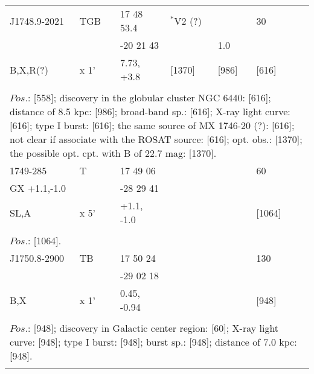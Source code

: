 \documentclass{aa}
\begin{document}
\begin{tabular}{p{2.5cm}p{1cm}p{1.8cm}p{2.3cm}p{3.3cm}p{2.0cm}p{2.2cm}}
\noalign{\smallskip}
J1748.9-2021  & TGB      & 17 48 53.4     & $^*$V2 (?)      &                        &  30                     &          \\
                           &                & -20 21 43      &                           & 1.0                 &                            &         \\
B,X,R(?)           & x 1'          & 7.73, +3.8      & [1370]              & [986]              & [616]                 &         \\
\\
\multicolumn{7}{p{17.5cm}}{
$Pos$.: [558]; discovery in the globular cluster NGC 6440: [616]; distance of 8.5 kpc: [986]; broad-band 
sp.: [616]; X-ray light curve: [616]; type I burst: [616]; the same source of MX 1746-20 (?): [616]; not clear if 
associate with the ROSAT source: [616]; opt. obs.: [1370]; the possible opt. cpt. with B of 22.7 mag: [1370].}\\
\noalign{\smallskip}
\hline

\noalign{\smallskip}
1749-285            & T            & 17 49 06             &                   &                             & 60                         &          \\
GX +1.1,-1.0      &                & -28 29 41            &                   &                             &                              &         \\
SL,A                   & x 5'        & +1.1, -1.0             &                   &                             & [1064]                    &          \\
\\
\multicolumn{7}{p{17.5cm}}{
$Pos$.: [1064].}\\
\noalign{\smallskip}
\hline

\noalign{\smallskip}
J1750.8-2900  & TB     & 17 50 24      &                  &                        & 130               &          \\
                           &           & -29 02 18     &                 &                        &                       &    \\
B,X                    & x 1'     & 0.45, -0.94   &                 &                        & [948]             &         \\
\\
\multicolumn{7}{p{17.5cm}}{
$Pos$.: [948]; discovery in Galactic center region: [60]; X-ray light curve: [948]; type I burst: [948]; burst sp.: [948]; 
distance of 7.0 kpc: [948].}\\
\noalign{\smallskip}
\hline


\end{tabular}
\end{document}
